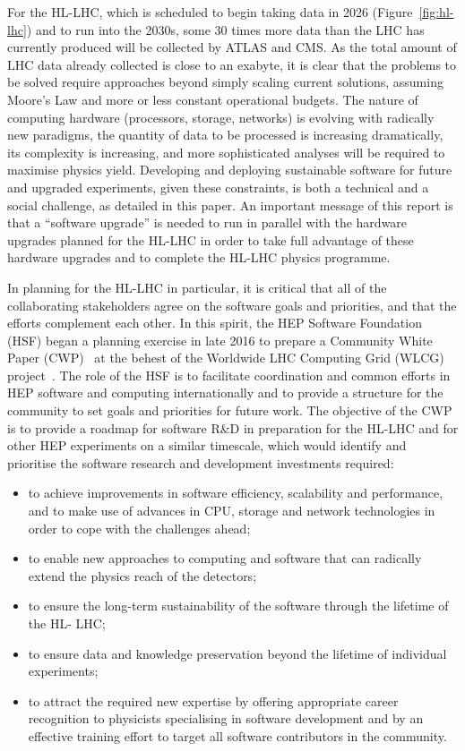 For the HL-LHC, which is scheduled to begin taking data in 2026 (Figure~\ref{fig:hl-lhc}) and to run into the 2030s, some 30 times more data than
the LHC has currently produced will be collected by ATLAS and CMS. As
the total amount of LHC data already collected is close to an exabyte,
it is clear that the problems to be solved require approaches beyond
simply scaling current solutions, assuming Moore's Law and more or less
constant operational budgets. The nature of computing hardware
(processors, storage, networks) is evolving with radically new
paradigms, the quantity of data to be processed is increasing
dramatically, its complexity is increasing, and more sophisticated
analyses will be required to maximise physics yield. Developing and
deploying sustainable software for future and upgraded experiments,
given these constraints, is both a technical and a social challenge, as
detailed in this paper. An important message of this report is that a
``software upgrade'' is needed to run in parallel with the hardware
upgrades planned for the HL-LHC in order to take full advantage of these hardware upgrades and to complete the HL-LHC physics programme.

In planning for the HL-LHC in particular, it is critical that all of the
collaborating stakeholders agree on the software goals and priorities,
and that the efforts complement each other. In this spirit, the HEP
Software Foundation (HSF) began a planning exercise in late 2016 to
prepare a Community White Paper (CWP)~\cite{HSF2017} at the behest of the Worldwide LHC
Computing Grid (WLCG) project~\cite{WLCG2016}. The role of the HSF is to
facilitate coordination and common efforts in HEP software and computing
internationally and to provide a structure for the community to set
goals and priorities for future work. The objective of the CWP is to
provide a roadmap for software R\&D in preparation for the HL-LHC and
for other HEP experiments on a similar timescale, which would identify
and prioritise the software research and development investments
required:

\begin{itemize}
\item
  to achieve improvements in software efficiency, scalability and
  performance, and to make use of advances in CPU, storage and network
  technologies in order to cope with the challenges ahead;
\item
  to enable new approaches to computing and software that can radically
  extend the physics reach of the detectors;
\item
  to ensure the long-term sustainability of the software through the
  lifetime of the HL- LHC;
\item
  to ensure data and knowledge preservation beyond the lifetime of
  individual experiments;
\item
  to attract the required new expertise by offering appropriate career
  recognition to physicists specialising in software development and by
  an effective training effort to target all software contributors in the
  community.
\end{itemize}

